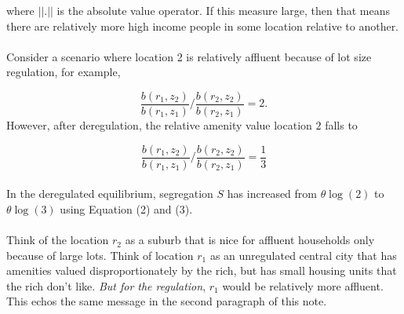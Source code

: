 \documentclass[]{article}
\begin{document}
where $\left|\left|.\right|\right|$ is the absolute value operator. If this measure large, then that means there are relatively more high income people in some location relative to another.

\paragraph*{}
Consider a scenario where location 2 is relatively affluent because of lot size regulation, for example,

\begin{equation*}
\frac{b(r_{1}, z_{2})}{b(r_{1}, z_{1})}/\frac{b(r_{2}, z_{2})}{b(r_{2}, z_{1})}	= 2.
\end{equation*}
However, after deregulation, the relative amenity value location $2$ falls to 

\begin{equation*}
	\frac{b(r_{1}, z_{2})}{b(r_{1}, z_{1})}/\frac{b(r_{2}, z_{2})}{b(r_{2}, z_{1})} = \frac{1}{3}
\end{equation*}
\paragraph*{}
In the deregulated equilibrium, segregation $S$ has increased from $\theta\log(2)$ to $\theta\log(3)$ using Equation (2) and (3). 

\paragraph*{}
Think of the location $r_{2}$ as a suburb that is nice for affluent households only because of large lots. Think of location $r_{1}$ as an unregulated central city that has amenities valued disproportionately by the rich, but has small housing units that the rich don't like. \textit{But for the regulation}, $r_{1}$ would be relatively more affluent. This echos the same message in the second paragraph of this note. 
\end{document}
